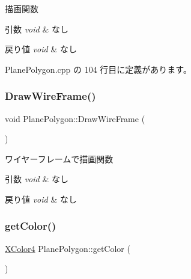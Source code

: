 描画関数 


\begin{DoxyParams}{引数}
{\em void} & なし \\
\hline
\end{DoxyParams}

\begin{DoxyRetVals}{戻り値}
{\em void} & なし \\
\hline
\end{DoxyRetVals}


 Plane\+Polygon.\+cpp の 104 行目に定義があります。

\mbox{\label{class_plane_polygon_a28ed1c8f4ca971b1a82e8c6567855779}} 
\subsubsection{\texorpdfstring{Draw\+Wire\+Frame()}{DrawWireFrame()}}
{\footnotesize\ttfamily void Plane\+Polygon\+::\+Draw\+Wire\+Frame (\begin{DoxyParamCaption}{ }\end{DoxyParamCaption})}



ワイヤーフレームで描画関数 


\begin{DoxyParams}{引数}
{\em void} & なし \\
\hline
\end{DoxyParams}

\begin{DoxyRetVals}{戻り値}
{\em void} & なし \\
\hline
\end{DoxyRetVals}
\mbox{\label{class_plane_polygon_a93bf115d1d918f4c6372ae760c19ce6b}} 
\subsubsection{\texorpdfstring{get\+Color()}{getColor()}}
{\footnotesize\ttfamily \mbox{\hyperlink{_vector3_d_8h_a680c30c4a07d86fe763c7e01169cd6cc}{X\+Color4}} Plane\+Polygon\+::get\+Color (\begin{DoxyParamCaption}{ }\end{DoxyParamCaption})}



